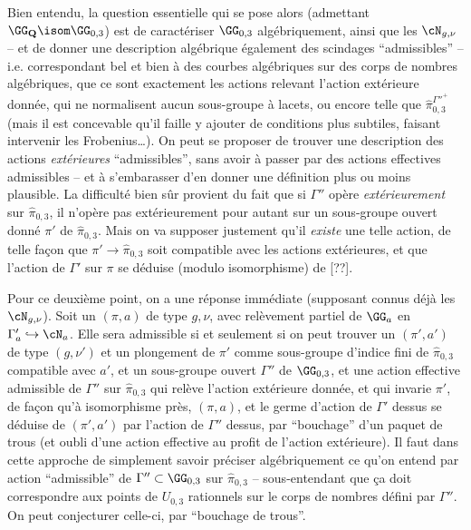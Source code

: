 Bien entendu, la question essentielle qui se pose alors (admettant
$\GG_\mathbf{Q} \isom \GG_{0,3}$) est de caractériser $\GG_{0,3}$
algébriquement, ainsi que les $\cN_{g,\nu}$ -- et de donner une
description algébrique également des scindages ``admissibles'' --
i.e. correspondant bel et bien à des courbes algébriques
sur des corps de nombres algébriques, que ce sont exactement
les actions relevant l'action extérieure donnée,
qui ne normalisent aucun sous-groupe à lacets, ou encore telle
que $\hat\pi_{0,3}^{\Gamma''^+}$ (mais il est concevable
qu'il faille y ajouter de conditions plus subtiles, faisant intervenir
les Frobenius\dots).  On peut se proposer de trouver une description
des actions {\it extérieures} ``admissibles'', sans avoir à
passer par des actions effectives admissibles -- et à s'embarasser d'en
donner une définition plus ou moins plausible.  La difficulté
bien s\^ur provient du fait que si $\Gamma''$ opère {\it extérieurement}
sur $\hat\pi_{0,3}$, il n'opère pas extérieurement pour autant 
sur un sous-groupe ouvert donné $\pi'$ de $\hat\pi_{0,3}$.
Mais on va supposer justement qu'il {\it existe} une telle action,
de telle fa\c con que $\pi'\to\hat\pi_{0,3}$ soit
compatible avec les actions extérieures, et que l'action de
$\Gamma'$ sur $\pi$ se déduise (modulo isomorphisme) de [??].

Pour ce deuxième point, on a une réponse immédiate
(supposant connus déjà les $\cN_{g,\nu}$).  Soit un $(\pi,a)$
de type $g,\nu$, avec relèvement partiel de $\GG_a$ en
$\Gamma'_a\hookrightarrow \cN_a$.  Elle sera admissible si et seulement
si on peut trouver un $(\pi',a')$ de type $(g,\nu')$ et un plongement
de $\pi'$ comme sous-groupe d'indice fini de $\hat\pi_{0,3}$
compatible avec $a'$, et un sous-groupe ouvert $\Gamma''$ de $\GG_{0,3}$,
et une action effective admissible de $\Gamma''$ sur $\hat\pi_{0,3}$
qui relève l'action extérieure donnée, et qui invarie $\pi'$,
de fa\c con qu'à isomorphisme près, $(\pi,a)$, et le germe d'action
de $\Gamma'$ dessus se déduise de $(\pi',a')$ par l'action de
$\Gamma''$ dessus, par ``bouchage'' d'un paquet de trous (et oubli
d'une action effective au profit de l'action extérieure).
Il faut dans cette approche de simplement savoir préciser
algébriquement ce qu'on entend par action ``admissible'' de
$\Gamma''\subset \GG_{0,3}$ sur $\hat\pi_{0,3}$ -- sous-entendant
que \c ca doit correspondre aux points de $U_{0,3}$ rationnels
sur le corps de nombres défini par $\Gamma''$.  On peut conjecturer
celle-ci, par ``bouchage de trous''.

